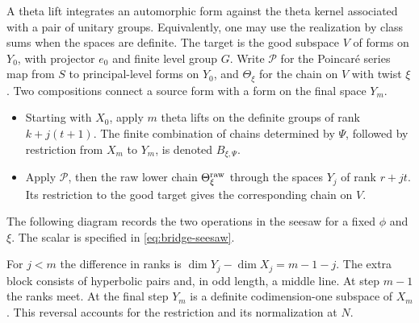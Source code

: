 A theta lift integrates an automorphic form against the theta kernel associated with a pair of unitary groups. Equivalently, one may use the realization by class sums when the spaces are definite. The target is the good subspace \(V\) of forms on \(Y_0\), with projector \(e_0\) and finite level group \(G\). Write \(\mathcal P\) for the Poincar\'e series map from \(S\) to principal-level forms on \(Y_0\), and \(\Theta_\xi\) for the chain on \(V\) with twist \(\xi\). Two compositions connect a source form with a form on the final space \(Y_m\).
\begin{itemize}
\item Starting with \(X_0\), apply \(m\) theta lifts on the definite groups of rank \(k+j(t+1)\). The finite combination of chains determined by \(\Psi\), followed by restriction from \(X_m\) to \(Y_m\), is denoted \(B_{\xi,\Psi}\).
\item Apply \(\mathcal P\), then the raw lower chain \(\Theta^{\rm raw}_\xi\) through the spaces \(Y_j\) of rank \(r+jt\). Its restriction to the good target gives the corresponding chain on \(V\).
\end{itemize}
The following diagram records the two operations in the seesaw for a fixed \(\phi\) and \(\xi\). The scalar is specified in \eqref{eq:bridge-seesaw}.
\begin{center}
\end{center}

For \(j<m\) the difference in ranks is \(\dim Y_j-\dim X_j=m-1-j\). The extra block consists of hyperbolic pairs and, in odd length, a middle line. At step \(m-1\) the ranks meet. At the final step \(Y_m\) is a definite codimension-one subspace of \(X_m\). This reversal accounts for the restriction and its normalization at \(N\).

